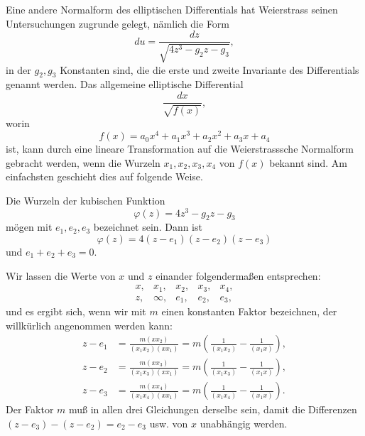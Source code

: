\documentclass[11pt]{article}
\begin{document}
Eine andere Normalform des elliptischen Differentials hat Weierstrass seinen Untersuchungen zugrunde gelegt, nämlich die Form
\begin{equation}
du=\frac{dz}{\sqrt{4z^3-g_2z-g_3}},
\tag{1}
\end{equation}
in der $g_2,g_3$ Konstanten sind, die die erste und zweite Invariante des Differentials genannt werden. Das allgemeine elliptische Differential
\begin{equation}
\frac{dx}{\sqrt{f(x)}},
\tag{2}
\end{equation}
worin
\begin{equation}
f(x)=a_0x^4+a_1x^3+a_2x^2+a_3x+a_4
\tag{3}
\end{equation}
ist, kann durch eine lineare Transformation auf die Weierstrasssche Normalform gebracht werden, wenn die Wurzeln $x_1,x_2,x_3,x_4$ von $f(x)$ bekannt sind. Am einfachsten geschieht dies auf folgende Weise.

Die Wurzeln der kubischen Funktion
\[
\varphi(z)=4z^3-g_2z-g_3
\]
mögen mit $e_1,e_2,e_3$ bezeichnet sein. Dann ist
\[
\varphi(z)=4(z-e_1)(z-e_2)(z-e_3)
\]
und $e_1+e_2+e_3=0$.

Wir lassen die Werte von $x$ und $z$ einander folgendermaßen entsprechen:
\[
\begin{array}{ccccc}
x,&x_1,&x_2,&x_3,&x_4,\\
z,&\infty,&e_1,&e_2,&e_3,
\end{array}
\]
und es ergibt sich, wenn wir mit $m$ einen konstanten Faktor bezeichnen, der willkürlich angenommen werden kann:
\begin{equation}
\begin{aligned}
z-e_1&=\frac{m(xx_2)}{(x_1x_2)(xx_1)}=m\left(\frac1{(x_1x_2)}-\frac1{(x_1x)}\right),\\
z-e_2&=\frac{m(xx_3)}{(x_1x_3)(xx_1)}=m\left(\frac1{(x_1x_3)}-\frac1{(x_1x)}\right),\\
z-e_3&=\frac{m(xx_4)}{(x_1x_4)(xx_1)}=m\left(\frac1{(x_1x_4)}-\frac1{(x_1x)}\right).
\end{aligned}
\tag{4}
\end{equation}
Der Faktor $m$ muß in allen drei Gleichungen derselbe sein, damit die Differenzen $(z-e_3)-(z-e_2)=e_2-e_3$ usw. von $x$ unabhängig werden.
\end{document}
